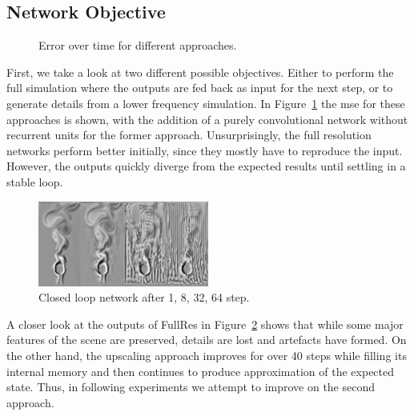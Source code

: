 \documentclass[sigconf]{acmart}
\begin{document}
\subsection{Network Objective}
\begin{figure}
	\caption{Error over time for different approaches.}
	\label{objectiveError}
\end{figure}
First, we take a look at two different possible objectives. Either to perform the full simulation where the outputs are fed back as input for the next step, or to generate details from a lower frequency simulation.
In Figure~\ref{objectiveError} the mse for these approaches is shown, with the addition of a purely convolutional network without recurrent units for the former approach. Unsurprisingly, the full resolution networks perform better initially, since they mostly have to reproduce the input. However, the outputs quickly diverge from the expected results until settling in a stable loop.
\begin{figure}
	\includegraphics[width=0.5\textwidth]{imgs/fullres_series.png}
	\caption{Closed loop network after 1, 8, 32, 64 step.}
	\label{closedLoop}
\end{figure}
A closer look at the outputs of FullRes in Figure~\ref{closedLoop} shows that while some major features of the scene are preserved, details are lost and artefacts have formed. On the other hand, the upscaling approach improves for over 40 steps while filling its internal memory and then continues to produce approximation of the expected state. Thus, in following experiments we attempt to improve on the second approach.
\end{document}
